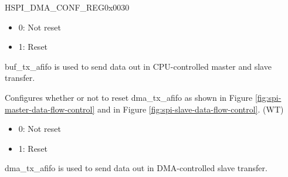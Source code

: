 \begin{register}{H}{SPI\_DMA\_CONF\_REG}{0x0030}
\begin{regdesc}
\begin{reglist}
\begin{itemize}
    \item 0: Not reset
    \item 1: Reset
\end{itemize}
buf\_tx\_afifo is used to send data out in CPU-controlled master and slave transfer.
\label{fielddesc:SPIDMAAFIFORST}\item [SPI\_DMA\_AFIFO\_RST] Configures whether or not to reset dma\_tx\_afifo as shown in Figure \ref{fig:spi-master-data-flow-control} and in Figure  \ref{fig:spi-slave-data-flow-control}. (WT)\\
\begin{itemize}
    \item 0: Not reset
    \item 1: Reset
\end{itemize}
dma\_tx\_afifo is used to send data out in DMA-controlled slave transfer.
\end{reglist}\end{regdesc}
\end{register}



